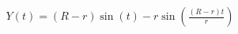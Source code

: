 \documentclass[preview]{standalone}
\begin{document}
\begin{align*}
Y(t) = (R - r) \sin(t) - r \sin\left(\frac{(R - r)t}{r}\right)
\end{align*}
\end{document}
